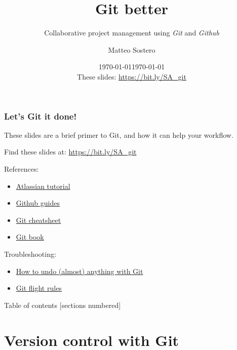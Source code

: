 \documentclass[10pt,svgnames]{beamer}
\title{Git better}
\subtitle{Collaborative project management using \emph{Git} and \emph{Github}}
\date{\today}
\author{Matteo Sostero}
\institute{Sant'Anna School of Advanced Studies}
\date{\today\\ These slides: \url{https://bit.ly/SA_git}}
\begin{document}
\maketitle

\begin{frame}
\frametitle{Let's Git it done!}
    
These slides are a brief primer to Git, and how it can help your workflow.

\bigskip

\centerline{Find these slides at: \url{https://bit.ly/SA_git}}

\bigskip
\pause

References:
\begin{itemize}
  \item \href{https://www.atlassian.com/git/tutorials}{Atlassian tutorial}
  \item \href{https://guides.github.com/}{Github guides}
  \item \href{http://ndpsoftware.com/git-cheatsheet.html}{Git cheatsheet}
  \item \href{https://git-scm.com/book/en/v2}{Git book}
\end{itemize}
\medskip

Troubleshooting:
\begin{itemize}
  \item \href{https://github.com/blog/2019-how-to-undo-almost-anything-with-git}{How to undo (almost) anything with Git}
  \item \href{https://github.com/k88hudson/git-flight-rules/blob/master/README.md}{Git flight rules}
\end{itemize}
\end{frame}

\begin{frame}{Table of contents}
[sections numbered]
\tableofcontents[hideallsubsections]
\end{frame}


\section{Version control with Git}
\end{document}
